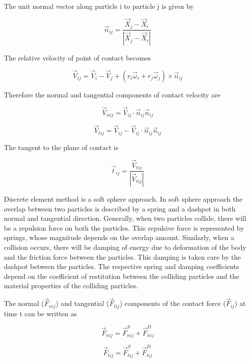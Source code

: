 The unit normal vector along particle i to particle j  is given by

\begin{equation}
  \label{eq:normal_unit}
  \vec{n}_{ij} = \frac{\vec{X}_{j} - \vec{X}_{i}}{|\vec{X}_{j} - \vec{X}_{i}|}
\end{equation}

The relative velocity of point of contact becomes

\begin{equation}
  \label{eq:relative}
  \vec{V}_{ij} = \vec{V}_{i} - \vec{V}_{j} +
  (r_{i} \vec{\omega}_{i} + r_{j} \vec{\omega}_{j}) \times \vec{n}_{ij}
\end{equation}

Therefore the normal and tangential components of contact velocity are

\begin{equation}
  \label{eq:normal_vel}
  \vec{V}_{nij} = \vec{V}_{ij} \cdot \vec{n}_{ij} \vec{n}_{ij}
\end{equation}

\begin{equation}
  \label{eq:tang_vel}
  \vec{V}_{tij} = \vec{V}_{ij} - \vec{V}_{ij} \cdot \vec{n}_{ij} \vec{n}_{ij}
\end{equation}

The tangent to the plane of contact is

\begin{equation}
  \label{eq:tang_unit}
  \vec{t}_{ij} = \frac{\vec{V}_{tij}}{|\vec{V}_{tij}|}
\end{equation}


Discrete element method is a soft sphere approach. In soft sphere
approach the overlap between two particles is described by a spring
and a dashpot in both normal and tangential direction. Generally, when
two particles collide, there will be a repulsion force on both the
particles. This repulsive force is represented by springs, whose
magnitude depends on the overlap amount. Similarly, when a collision
occurs, there will be damping of energy due to deformation of the body
and the friction force between the particles. This damping is taken
care by the dashpot between the particles. The respective spring and
damping coefficients depend on the coefficient of restitution between
the colliding particles and the material properties of the colliding
particles.


The normal ($\vec{F}_{nij}$) and tangential ($\vec{F}_{tij}$) components of the contact force ($\vec{F}_{ij}$) at time t can be written as

\begin{equation}
  \label{eq:normal_force}
  \vec{F}_{nij} =  \vec{F}_{nij}^S +  \vec{F}_{nij}^D
\end{equation}

\begin{equation}
  \label{eq:tang_force}
  \vec{F}_{tij} =  \vec{F}_{tij}^S +  \vec{F}_{tij}^D
\end{equation}






